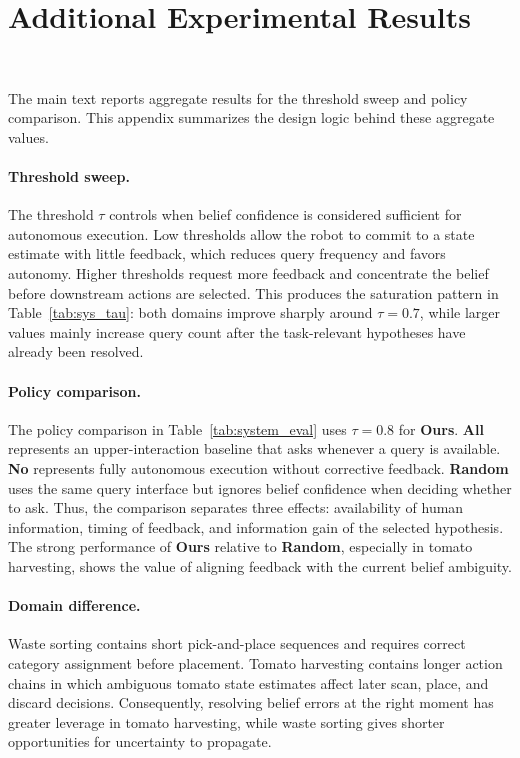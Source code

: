 \section{Additional Experimental Results}~\label{appx:exp}

The main text reports aggregate results for the threshold sweep and policy comparison. This appendix summarizes the design logic behind these aggregate values.

\paragraph{Threshold sweep.}
The threshold $\tau$ controls when belief confidence is considered sufficient for autonomous execution. Low thresholds allow the robot to commit to a state estimate with little feedback, which reduces query frequency and favors autonomy. Higher thresholds request more feedback and concentrate the belief before downstream actions are selected. This produces the saturation pattern in Table~\ref{tab:sys_tau}: both domains improve sharply around $\tau=0.7$, while larger values mainly increase query count after the task-relevant hypotheses have already been resolved.

\paragraph{Policy comparison.}
The policy comparison in Table~\ref{tab:system_eval} uses $\tau=0.8$ for \textbf{Ours}. \textbf{All} represents an upper-interaction baseline that asks whenever a query is available. \textbf{No} represents fully autonomous execution without corrective feedback. \textbf{Random} uses the same query interface but ignores belief confidence when deciding whether to ask. Thus, the comparison separates three effects: availability of human information, timing of feedback, and information gain of the selected hypothesis. The strong performance of \textbf{Ours} relative to \textbf{Random}, especially in tomato harvesting, shows the value of aligning feedback with the current belief ambiguity.

\paragraph{Domain difference.}
Waste sorting contains short pick-and-place sequences and requires correct category assignment before placement. Tomato harvesting contains longer action chains in which ambiguous tomato state estimates affect later scan, place, and discard decisions. Consequently, resolving belief errors at the right moment has greater leverage in tomato harvesting, while waste sorting gives shorter opportunities for uncertainty to propagate.
